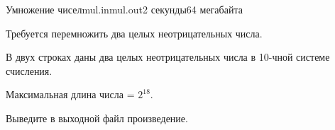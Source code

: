 \begin{problem}{Умножение чисел}{mul.in}{mul.out}{2 секунды}{64 мегабайта}

Требуется перемножить два целых неотрицательных числа.

\InputFile

В двух строках даны два целых неотрицательных числа в 10-чной системе счисления.

Максимальная длина числа = $2^{18}$.

\OutputFile

Выведите в выходной файл произведение.

\Example

\begin{example}
%
\end{example}

\end{problem}

